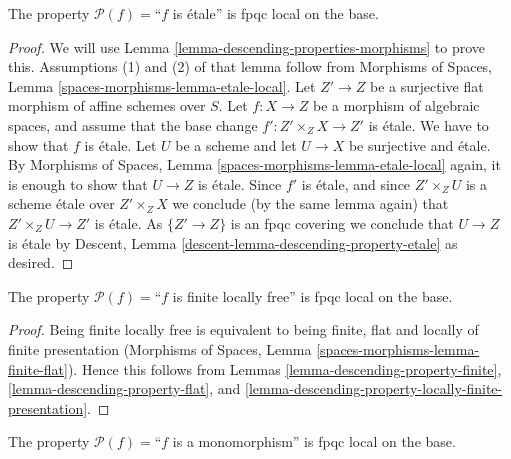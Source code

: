 \begin{lemma}
\label{lemma-descending-property-etale}
The property $\mathcal{P}(f) =$``$f$ is \'etale''
is fpqc local on the base.
\end{lemma}

\begin{proof}
We will use
Lemma \ref{lemma-descending-properties-morphisms}
to prove this. Assumptions (1) and (2) of that lemma follow from
Morphisms of Spaces,
Lemma \ref{spaces-morphisms-lemma-etale-local}.
Let $Z' \to Z$ be a surjective flat morphism of affine schemes over $S$.
Let $f : X \to Z$ be a morphism of algebraic spaces, and assume
that the base change $f' : Z' \times_Z X \to Z'$ is \'etale.
We have to show that $f$ is \'etale. Let $U$ be a scheme
and let $U \to X$ be surjective and \'etale. By
Morphisms of Spaces,
Lemma \ref{spaces-morphisms-lemma-etale-local}
again, it is enough to show that $U \to Z$ is \'etale.
Since $f'$ is \'etale, and since $Z' \times_Z U$ is a
scheme \'etale over $Z' \times_Z X$ we conclude (by the same lemma again) that
$Z' \times_Z U \to Z'$ is \'etale.
As $\{Z' \to Z\}$ is an fpqc covering we conclude that
$U \to Z$ is \'etale by
Descent, Lemma \ref{descent-lemma-descending-property-etale}
as desired.
\end{proof}

\begin{lemma}
\label{lemma-descending-property-finite-locally-free}
The property $\mathcal{P}(f) =$``$f$ is finite locally free''
is fpqc local on the base.
\end{lemma}

\begin{proof}
Being finite locally free is equivalent to being
finite, flat and locally of finite presentation
(Morphisms of Spaces, Lemma \ref{spaces-morphisms-lemma-finite-flat}).
Hence this follows from Lemmas
\ref{lemma-descending-property-finite},
\ref{lemma-descending-property-flat}, and
\ref{lemma-descending-property-locally-finite-presentation}.
\end{proof}

\begin{lemma}
\label{lemma-descending-property-monomorphism}
The property $\mathcal{P}(f) =$``$f$ is a monomorphism''
is fpqc local on the base.
\end{lemma}

